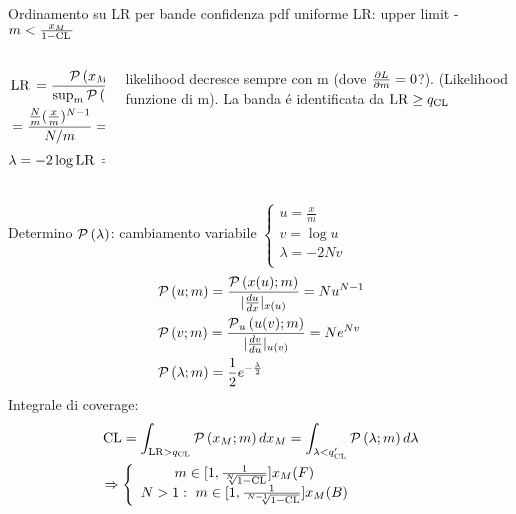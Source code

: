 \begin{wordonframe}{Ordinamento su LR per bande confidenza pdf uniforme}
	LR: upper limit - $m<\frac{x_M}{1-\cl{}}$
	\begin{columns}[T]
	\begin{column}{0.5\textwidth}
\begin{align*}
&\lr{}=\frac{\prob{(x_M;m)}}{\sup_m{\prob{(x_M;m)}}}\\
&=\frac{\frac{N}{m}(\frac{x}{m})^{N-1}}{N/m}=(\frac{x}{m})^N\\
&\lambda=-2\log{\lr{}}=-2N\log{\frac{x}{m}}
\end{align*}
	\end{column}
	\begin{column}{0.5\textwidth}
likelihood decresce sempre con m (dove $\PDy{m}{L}=0$?).  (Likelihood funzione di m).
La banda \'e identificata da $\lr\geq q_{\cl{}}$
	\end{column}
\end{columns}
Determino $\prob{(\lambda)}$: cambiamento variabile $\left\{\begin{array}{c}
u=\frac{x}{m}\\
v=\log{u}\\
\lambda=-2Nv\\
\end{array}\right.$
\begin{align*}
&\prob{(u;m)}=\frac{\prob{(x(u);m)}}{|\TDy{x}{u}|_{x(u)}}=Nu^{N-1}\\
&\prob{(v;m)}=\frac{\prob_u{(u(v);m)}}{|\TDy{u}{v}|_{u(v)}}=N\exp{Nv}\\
&\prob{(\lambda;m)}=\frac{1}{2}\exp{-\frac{\lambda}{2}}
\end{align*}
Integrale di coverage:
\begin{align*}
&\cl=\int_{\lr>q_{\cl}}\prob{(x_M;m)}\,dx_M=\int_{\lambda<q_{\cl}'}\prob{(\lambda;m)}\,d\lambda\\
&\Rightarrow \left\{\begin{array}{c}
m\in[1,\frac{1}{\sqrt[N]{1-\cl}}]x_M (F)\\
N>1:\ m\in[1,\frac{1}{\sqrt[N-1]{1-\cl}}]x_M (B)\\
\end{array}
\right.
\end{align*}
\end{wordonframe}


